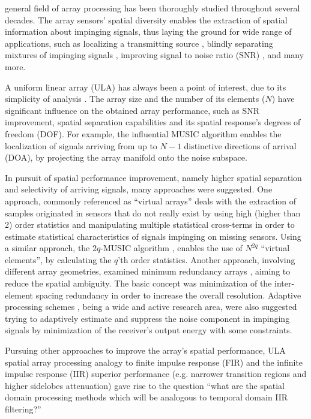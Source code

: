 general field of array processing has been thoroughly studied throughout several decades.
The array sensors' spatial diversity enables the extraction of spatial information about impinging signals, thus laying the ground for wide range of applications, such as localizing a transmitting source \cite{skolnik2008radar,long2019}, blindly separating mixtures of impinging signals \cite{comon1994independent}, improving signal to noise ratio (SNR) \cite{verdu1998multiuser}, and many more. 
\par A uniform linear array (ULA) has always been a point of interest, due to its simplicity of analysis \cite{van2004optimum,benesty2018}. 
The array size and the number of its elements ($N$) have significant influence on the obtained array performance, such as SNR improvement, spatial separation capabilities and its spatial response's degrees of freedom (DOF). For example, the influential MUSIC algorithm \cite{schmidt1986multiple} enables the localization of signals arriving from up to $N-1$ distinctive directions of arrival (DOA), by projecting the array manifold onto the noise subspace.
\par In pursuit of spatial performance improvement, namely higher spatial separation and selectivity of arriving signals, many approaches were suggested.  
One approach, commonly referenced as ``virtual arrays'' \cite{pal2010nested,chevalier2005virtual,dogan1995applications} deals with the extraction of samples originated in sensors that do not really exist by using high (higher than 2) order statistics and manipulating multiple statistical cross-terms in order to estimate statistical characteristics of signals impinging on missing sensors.
Using a similar approach, the $2q$-MUSIC algorithm \cite{chevalier2006high}, enables the use of $N^{2q}$ ``virtual elements'', by calculating the $q$'th order statistics.
Another approach, involving different array geometries, examined minimum redundancy arrays \cite{moffet1968minimum,pillai1985new,pillai1987statistical,Kupershtein2013}, aiming to reduce the spatial ambiguity. The basic concept was minimization of the inter-element spacing redundancy in order to increase the overall resolution. Adaptive processing schemes \cite{frost1972algorithm,manolakis2000statistical}, being a wide and active  research area, were also suggested trying to adaptively estimate and suppress the noise component in impinging signals by minimization of the receiver's output energy with some constraints.
\par Pursuing other approaches to improve the array's spatial performance, ULA spatial array processing analogy to finite impulse response (FIR) \cite{van1988beamforming} and the infinite impulse response (IIR) superior performance (e.g. narrower transition regions and higher sidelobes attenuation) gave rise to the question ``what are the spatial domain processing methods which will be analogous to temporal domain IIR filtering?''
